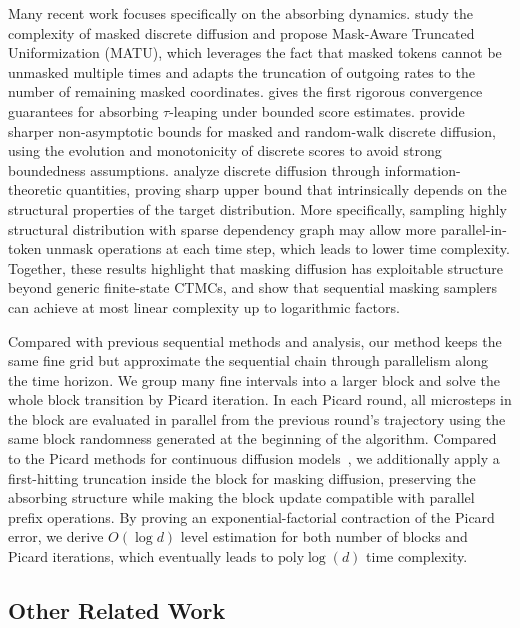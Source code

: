 \documentclass{article}
\begin{document}
Many recent work focuses specifically on the absorbing dynamics. \citep{huang2025complexity} study the complexity of masked discrete diffusion and propose Mask-Aware Truncated Uniformization (MATU), which leverages the fact that masked tokens cannot be unmasked multiple times and adapts the truncation of outgoing rates to the number of remaining masked coordinates. \citep{liangabsorb} gives the first rigorous convergence guarantees for absorbing $\tau$-leaping under bounded score estimates. \citep{conforti2025non} provide sharper non-asymptotic bounds for masked and random-walk discrete diffusion, using the evolution and monotonicity of discrete scores to avoid strong boundedness assumptions. \citep{dmitriev2026efficient} analyze discrete diffusion through information-theoretic quantities, proving sharp upper bound that intrinsically depends on the structural properties of the target distribution. More specifically, sampling highly structural distribution with sparse dependency graph may allow more parallel-in-token unmask operations at each time step, which leads to lower time complexity.
%
Together, these results highlight that masking diffusion has exploitable structure beyond generic finite-state CTMCs, and show that sequential masking samplers can achieve at most linear complexity up to logarithmic factors.

Compared with previous sequential methods and analysis, our method keeps the same fine grid but approximate the sequential chain through parallelism along the time horizon. 
%
We group many fine intervals into a larger block and solve the whole block transition by Picard iteration. 
%
In each Picard round, all microsteps in the block are evaluated in parallel from the previous round's trajectory using the same block randomness generated at the beginning of the algorithm. 
%
Compared to the Picard methods for continuous diffusion models~\citep{chen2024accelerating, shih2023parallel, zhouparallel}, we additionally apply a first-hitting truncation inside the block for masking diffusion, preserving the absorbing structure while making the block update compatible with parallel prefix operations.
%
By proving an exponential-factorial contraction of the Picard error, we derive $O(\log d)$ level estimation for both number of blocks and Picard iterations, which eventually leads to $\mathrm{poly}\log(d)$ time complexity.

\subsection{Other Related Work}
\end{document}
